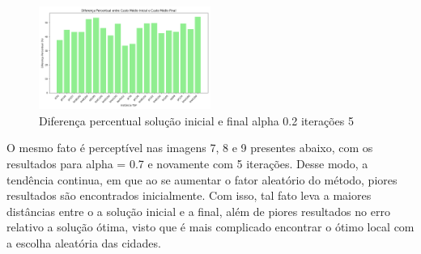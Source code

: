 \documentclass[10pt]{extarticle} %
\begin{document}
\begin{figure}[H]
    \centering
    \includegraphics[width=0.5\textwidth]{./plots/path_difference_saida_02_5.log.png}
    \caption{Diferença percentual solução inicial e final alpha 0.2 iterações 5}
    \label{fig:Diferença percentual solução inicial e final alpha 0.2 iterações 5}
\end{figure}

O mesmo fato é perceptível nas imagens 7, 8 e 9 presentes abaixo, com os resultados para alpha = 0.7 e novamente com 5 iterações. Desse modo, a tendência continua, em que ao se aumentar o fator aleatório do método, piores resultados são encontrados inicialmente. Com isso, tal fato leva a maiores distâncias entre o a solução inicial e a final, além de piores resultados no erro relativo a solução ótima, visto que é mais complicado encontrar o ótimo local com a escolha aleatória das cidades.
\end{document}
